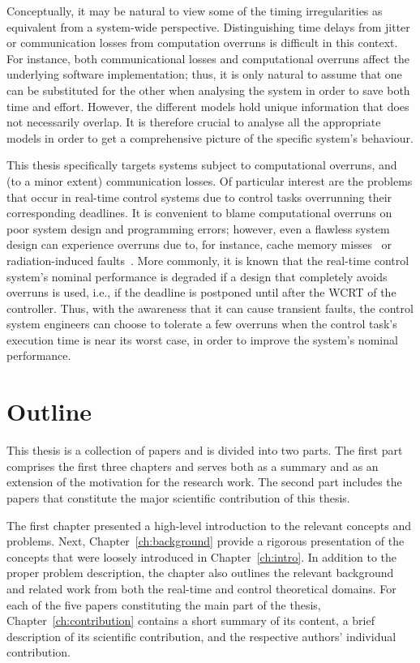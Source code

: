 %
Conceptually, it may be natural to view some of the timing irregularities as equivalent from a system-wide perspective.
Distinguishing time delays from jitter or communication losses from computation overruns is difficult in this context.
For instance, both communicational losses and computational overruns affect the underlying software implementation; thus, it is only natural to assume that one can be substituted for the other when analysing the system in order to save both time and effort.
However, the different models hold unique information that does not necessarily overlap.
It is therefore crucial to analyse all the appropriate models in order to get a comprehensive picture of the specific system's behaviour.

This thesis specifically targets systems subject to computational overruns, and (to a minor extent) communication losses.
Of particular interest are the problems that occur in real-time control systems due to control tasks overrunning their corresponding deadlines.
It is convenient to blame computational overruns on poor system design and programming errors; however, even a flawless system design can experience overruns due to, for instance, cache memory misses~\cite{Gracioli:2015} or radiation-induced faults~\cite{Tsog:2021}.
More commonly, it is known that the real-time control system's nominal performance is degraded if a design that completely avoids overruns is used, i.e., if the deadline is postponed until after the WCRT of the controller.
Thus, with the awareness that it can cause transient faults, the control system engineers can choose to tolerate a few overruns when the control task's execution time is near its worst case, in order to improve the system's nominal performance.



\section{Outline}%
\label{sec:intro:outline}%
%
This thesis is a collection of papers and is divided into two parts.
The first part comprises the first three chapters and serves both as a summary and as an extension of the motivation for the research work.
The second part includes the papers that constitute the major scientific contribution of this thesis.

The first chapter presented a high-level introduction to the relevant concepts and problems.
Next, Chapter~\ref{ch:background} provide a rigorous presentation of the concepts that were loosely introduced in Chapter~\ref{ch:intro}.
In addition to the proper problem description, the chapter also outlines the relevant background and related work from both the real-time and control theoretical domains.
For each of the five papers constituting the main part of the thesis, Chapter~\ref{ch:contribution} contains a short summary of its content, a brief description of its scientific contribution, and the respective authors' individual contribution.
